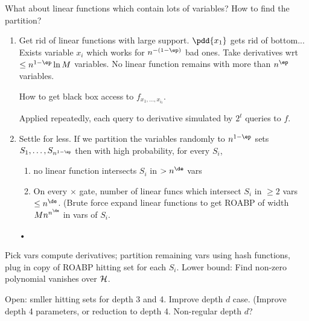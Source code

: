 What about linear functions which contain lots of variables? How to find the partition?
\begin{enumerate}
\item
Get rid of linear functions with large support. $\pdd{x_1}$ gets rid of bottom... Exists variable $x_i$ which works for $n^{-(1-\ep)}$ bad ones. Take derivatives wrt $\le n^{1-\ep} \ln M$ variables. No linear function remains with more than $n^\ep$ variables. 

How to get black box access to $f_{x_1,\ldots, x_{i_t}}$.

Applied repeatedly, each query to derivative simulated by $2^t$ queries to $f$.
\item
Settle for less. If we partition the variables randomly to $n^{1-\ep}$ sets $S_1,\ldots, S_{n^{1-\ep}}$ then with high probability, for every $S_i$, 
\begin{enumerate}
\item
no linear function intersects $S_i$ in $>n^\de$ vars
\item On every $\times$ gate, number of linear funcs which intersect $S_i$ in $\ge 2$ vars $\le n^\de$. (Brute force expand linear functions to get ROABP of width $Mn^{n^\de}$ in vars of $S_i$.
\end{enumerate}•
\end{enumerate}

Pick vars compute derivatives; partition remaining vars using hash functions, plug in copy of ROABP hitting set for each $S_i$. Lower bound: Find non-zero polynomial vanishes over $\cal H$.

Open: smller hitting sets for depth 3 and 4. Improve depth $d$ case. (Improve depth 4 parameters, or reduction to depth 4. Non-regular depth $d$?